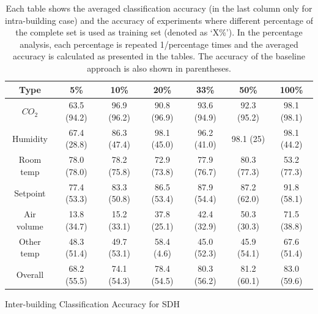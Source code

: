 \begin{table}[ht!]
\centering %
\begin{tabular}{c | c | c | c | c | c | c} \hline
Type & 5\% & 10\% & 20\% & 33\% & 50\% & 100\%\\ %
\hline\hline %
$CO_{2}$ & 63.5 (94.2) & 96.9 (96.2) & 90.8 (96.9) & 93.6 (94.9) & 92.3 (95.2) & 98.1 (98.1)\\ \hline
Humidity & 67.4 (28.8) & 86.3 (47.4) & 98.1 (45.0) & 96.2 (41.0) & 98.1 (25) & 98.1 (44.2)\\ \hline
Room temp & 78.0 (78.0) & 78.2 (75.8) & 72.9 (73.8) & 77.9 (76.7) & 80.3 (77.3) & 53.2 (77.3)\\ \hline
Setpoint & 77.4 (53.3) & 83.3 (50.8) & 86.5 (53.4) & 87.9 (54.4) & 87.2 (62.0) & 91.8 (58.1)\\ \hline
Air volume & 13.8 (34.7) & 15.2 (33.1) & 37.8 (25.1) & 42.4 (32.9) & 50.3 (30.3) & 71.5 (38.8)\\ \hline
Other temp & 48.3 (51.4) & 49.7 (53.1) & 58.4 (4.6) & 45.0 (52.3) & 45.9 (54.1) & 67.6 (51.4)\\ \hline
Overall & 68.2 (55.5) & 74.1 (54.3) & 78.4 (54.5) & 80.3 (56.2) & 81.2 (60.1) & 83.0 (59.6)\\ \hline
\end{tabular}
\caption{Inter-building Classification Accuracy for SDH}
\caption*{Each table shows the averaged classification accuracy (in the last column only for intra-building case) and the accuracy of experiments where different percentage of the complete set is used as training set (denoted as `X\%'). In the percentage analysis, each percentage is repeated 1/percentage times and the averaged accuracy is calculated as presented in the tables. The accuracy of the baseline approach is also shown in parentheses.}
\label{table:sdh_x} %
\end{table}

